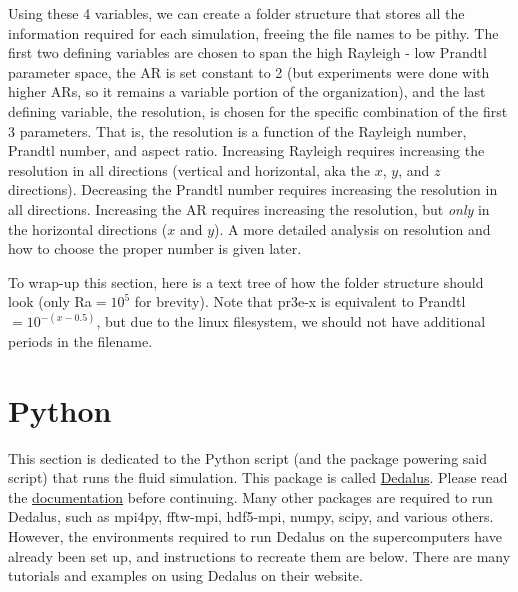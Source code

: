 \documentclass[12pt,a4paper]{report}
\newcommand{\pb}{\pagebreak}
\begin{document}
		Using these 4 variables, we can create a folder structure that stores all the information required for each simulation, freeing the file names to be pithy. The first two defining variables are chosen to span the high Rayleigh - low Prandtl parameter space, the AR is set constant to 2 (but experiments were done with higher ARs, so it remains a variable portion of the organization), and the last defining variable, the resolution, is chosen for the specific combination of the first 3 parameters. That is, the resolution is a function of the Rayleigh number, Prandtl number, and aspect ratio. Increasing Rayleigh requires increasing the resolution in all directions (vertical and horizontal, aka the $x$, $y$, and $z$ directions). Decreasing the Prandtl number requires increasing the resolution in all directions. Increasing the AR requires increasing the resolution, but \textit{only} in the horizontal directions ($x$ and $y$). A more detailed analysis on resolution and how to choose the proper number is given later. 
		
		To wrap-up this section, here is a text tree of how the folder structure should look (only Ra$=10^5$ for brevity). Note that pr3e-x is equivalent to Prandtl $= 10^{-(x-0.5)}$, but due to the linux filesystem, we should not have additional periods in the filename.

		\pb



\chapter{Python}

	This section is dedicated to the Python script (and the package powering said script) that runs the fluid simulation. This package is called \href{https://dedalus-project.org}{Dedalus}. Please read the \href{https://dedalus-project.readthedocs.io/en/latest/}{documentation} before continuing. Many other packages are required to run Dedalus, such as mpi4py, fftw-mpi, hdf5-mpi, numpy, scipy, and various others. However, the environments required to run Dedalus on the supercomputers have already been set up, and instructions to recreate them are below. There are many tutorials and examples on using Dedalus on their website.
\end{document}
